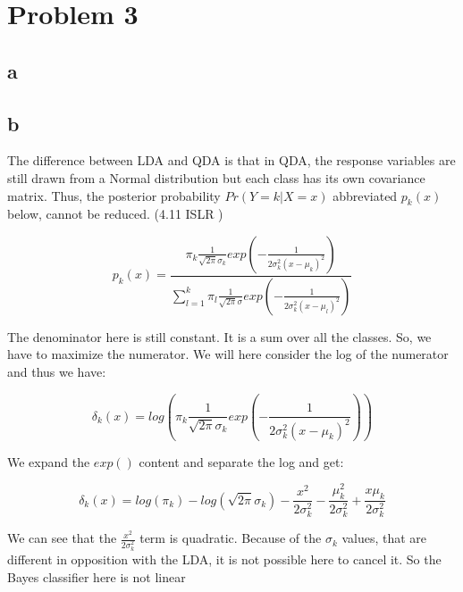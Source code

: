 \section*{Problem 3}

\subsection*{a}





\subsection*{b}
The difference between LDA and QDA is that in QDA, the response variables are still drawn from a Normal distribution but each class has its own covariance matrix. Thus, the posterior probability $ Pr(Y = k | X = x) $ abbreviated $ p_k(x) $ below, cannot be reduced. (4.11 ISLR )

\[ p_k (x) = \frac{\pi_k \frac{1}{\sqrt{2\pi}\sigma_k}exp({-\frac{1}{2\sigma^2_k (x - \mu_k)^2}})}{\sum_{l=1}^{k}\pi_l \frac{1}{\sqrt{2\pi}\sigma}exp({-\frac{1}{2\sigma^2_k (x - \mu_l)^2}})} \]

The denominator here is still constant. It is a sum over all the classes. So, we have to maximize the numerator. We will here consider the log of the numerator and thus we have:

\[ \delta_k (x) = log\left({\pi_k \frac{1}{\sqrt{2\pi}\sigma_k}exp\left({-\frac{1}{2\sigma^2_k (x - \mu_k)^2}}\right)}\right) \]

We expand the $exp()$ content and separate the log and get:

\[ \delta_k (x) = log(\pi_k) - log(\sqrt{2\pi}\sigma_k) - \frac{x^2}{2\sigma^2_k} - \frac{\mu^2_k}{2\sigma^2_k} + \frac{x\mu_k}{2\sigma^2_k} \]

We can see that the $\frac{x^2}{2\sigma^2_k}$ term is quadratic. Because of the $\sigma_k$ values, that are different in opposition with the LDA, it is not possible here to cancel it. So the Bayes classifier here is not linear



